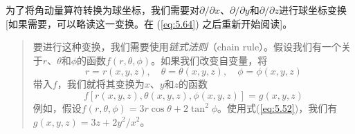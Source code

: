     为了将角动量算符转换为球坐标，我们需要对$\partial /\partial x$、$\partial /\partial y$和$\partial /\partial z$进行球坐标变换[如果需要，可以略读这一变换。在 (\ref{eq:5.64}) 之后重新开始阅读]。
    \begin{quote}
        \small 要进行这种变换，我们需要使用\textit{链式法则}（chain rule）。假设我们有一个关于$r$、$\theta$和$\phi$的函数$f\left(r,\theta,\phi\right)$。如果我们改变自变量，将
        \begin{equation*}
            r =r\left(x,y,z\right), \quad \theta = \theta\left(x,y,z\right), \quad \phi = \phi\left(x,y,z\right)
        \end{equation*}
        带入$f$，我们就将其变换为$x$、$y$和$z$的函数
        \begin{equation*}
            f\left[r\left(x,y,z\right),\theta\left(x,y,z\right),\phi\left(x,y,z\right)\right] = g\left(x,y,z\right)
        \end{equation*}
        例如，假设$f\left(r,\theta,\phi\right) = 3r\cos\theta+2\tan^2\phi$。使用式(\ref{eq:5.52})，我们有$g\left(x,y,z\right) = 3z+2y^{2}/x^{2}$。


\end{quote}
